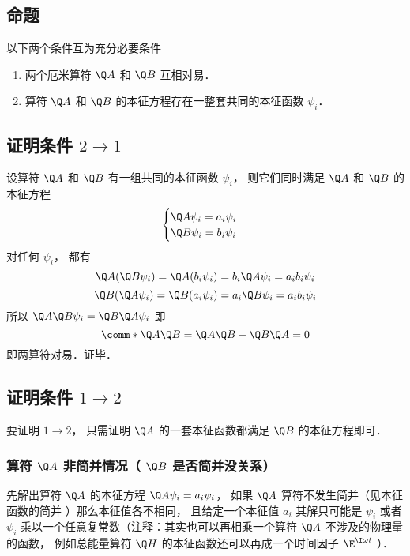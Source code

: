 

\subsection{命题}
以下两个条件互为充分必要条件
\begin{enumerate}
\item 两个厄米算符 $\Q A$ 和 $\Q B$ 互相对易．
\item 算符 $\Q A$ 和 $\Q B$ 的本征方程存在一整套共同的本征函数 $\psi_i$．
\end{enumerate}

\subsection{证明条件 $2 \to 1$}
设算符 $\Q A$ 和 $\Q B$ 有一组共同的本征函数 $\psi_i$，  则它们同时满足 $\Q A$ 和 $\Q B$ 的本征方程
\begin{equation}
\begin{cases}
\Q A \psi_i = a_i \psi_i\\
\Q B \psi_i = b_i \psi_i
\end{cases}
\end{equation}
对任何 $\psi_i$，  都有
\begin{equation}
\Q A (\Q B \psi_i) = \Q A (b_i \psi_i) = b_i\Q A \psi_i = a_i b_i \psi_i
\end{equation}
\begin{equation}
\Q B (\Q A \psi_i) = \Q B (a_i \psi_i) = a_i \Q B \psi_i = a_i b_i \psi_i
\end{equation}
所以 $\Q A\Q B \psi_i = \Q B\Q A \psi_i$ 即
\begin{equation}
\comm*{\Q A}{\Q B} = \Q A\Q B - \Q B\Q A = 0
\end{equation}
即两算符对易．证毕．

\subsection{证明条件 $1 \to 2$}
要证明 $1 \to 2$，  只需证明 $\Q A$ 的一套本征函数都满足 $\Q B$ 的本征方程即可．

\subsubsection{算符 $\Q A$ 非简并情况（ $\Q B$ 是否简并没关系）}
先解出算符 $\Q A$ 的本征方程 $\Q A \psi_i = a_i \psi_i$，  如果 $\Q A$ 算符不发生简并（见本征函数的简并%
  ）那么本征值各不相同， 且给定一个本征值 $a_i$ 其解只可能是 $\psi_i$ 或者 $\psi_i$ 乘以一个任意复常数（注释：其实也可以再相乘一个算符 $\Q A$ 不涉及的物理量的函数， 例如总能量算符 $\Q H$ 的本征函数还可以再成一个时间因子 $\E^{\I\omega t}$ ）．

